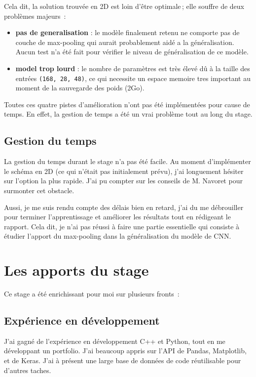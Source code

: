 Cela dit, la solution trouvée en 2D est loin d'être optimale ; elle souffre de deux problèmes majeurs :
\begin{itemize}
 \item \textbf{pas de generalisation} : le modèle finalement retenu ne comporte pas de couche de max-pooling qui aurait probablement aidé a la généralisation. Aucun test n'a été fait pour vérifier le niveau de généralisation de ce modèle.
 \item \textbf{model trop lourd} : le nombre de paramètres est très élevé dû à la taille des entrées \verb|(168, 28, 48)|, ce qui necessite un espace memoire tres important au moment de la sauvegarde des poids (2Go).
\end{itemize}

Toutes ces quatre pistes d'amélioration n'ont pas été implémentées pour cause de temps. En effet, la gestion de temps a été un vrai problème tout au long du stage.

\subsection{Gestion du temps}
La gestion du temps durant le stage n'a pas été facile. Au moment d'implémenter le schéma en 2D (ce qui n'était pas initialement prévu), j'ai longuement hésiter sur l'option la plus rapide. J'ai pu compter sur les conseils de M. Navoret pour surmonter cet obstacle. 

Aussi, je me suis rendu compte des délais bien en retard, j'ai du me débrouiller pour terminer l'apprentissage et améliorer les résultats tout en rédigeant le rapport. Cela dit, je n'ai pas réussi à faire une partie essentielle qui consiste à étudier l'apport du max-pooling dans la généralisation du modèle de CNN.


\section{Les apports du stage}

Ce stage a été enrichissant pour moi sur plusieurs fronts :

\subsection{Expérience en développement}
J'ai gagné de l'expérience en développement C++ et Python, tout en me développant un portfolio. J'ai beaucoup appris sur l'API de Pandas, Matplotlib, et de Keras. J'ai à présent une large base de données de code réutilisable pour d'autres taches.

